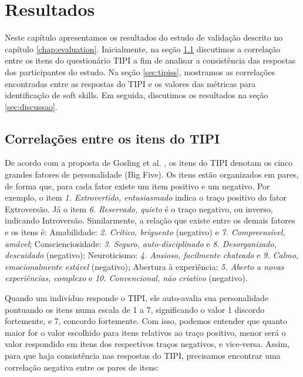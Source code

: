 

\chapter{Resultados}

\label{chap:results}

Neste capítulo apresentamos os resultados do estudo de validação descrito no capítulo \ref{chap:evaluation}. Inicialmente, na seção \ref{sec:tipitipi} discutimos a correlação entre os itens do questionário TIPI a fim de analisar a consistência das respostas dos participantes do estudo. Na seção \ref{sec:tipiss}, mostramos as correlações encontradas entre as respostas do TIPI e os valores das métricas para identificação de soft skills. Em seguida, discutimos os resultados na seção \ref{sec:discussao}.

\section{Correlações entre os itens do TIPI}
\label{sec:tipitipi}

De acordo com a proposta de Gosling et al. \cite{gosling:03}, os itens do TIPI denotam os cinco grandes fatores de personalidade (Big Five). Os itens estão organizados em pares, de forma que,
para cada fator existe um item positivo e um negativo.
Por exemplo, o item \textit{1. Extrovertido, entusiasmado} indica o traço positivo do fator Extroversão. Já o item \textit{6. Reservado, quieto} é o traço negativo, ou inverso, indicando Introversão.
Similarmente, a relação que existe entre os demais fatores e os itens é:
Amabilidade: \textit{2. Crítico, briguento} (negativo) e \textit{7. Compreensível, amável}; 
Conscienciosidade: \textit{3. Seguro, auto-disciplinado} e \textit{8. Desorganizado, descuidado} (negativo);
Neuroticismo: \textit{4. Ansioso, facilmente chateado} e \textit{9. Calmo, emocionalmente estável} (negativo);
Abertura à experiência: \textit{5. Aberto a novas experiências, complexo} e \textit{10. Convencional, não criativo} (negativo).

Quando um indivíduo responde o TIPI, ele auto-avalia sua personalidade pontuando os itens numa escala de 1 a 7, significando o valor 1 discordo fortemente, e 7, concordo fortemente.
Com isso, podemos entender que quanto maior for o valor escolhido para itens relativos ao traço positivo, menor será o valor respondido em itens dos respectivos traços negativos, e vice-versa.
Assim, para que haja consistência nas respostas do TIPI, precisamos encontrar uma correlação negativa entre os pares de itens:

